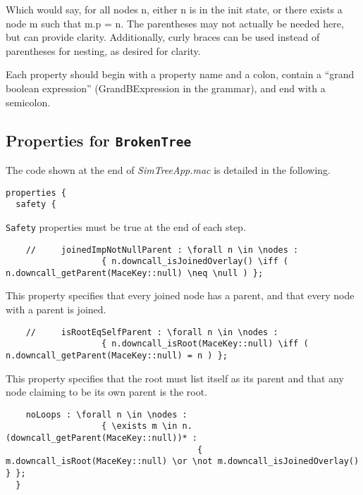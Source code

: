\documentclass[12pt,letterpaper]{article}
\newenvironment{code}
{\begin{list}{}{\setlength{\leftmargin}{1em}}\item\scriptsize\bfseries}
{\end{list}}
\begin{document}
Which would say, for all nodes n, either n is in the init state, or there exists a node m such that m.p = n.  The parentheses may not actually be needed here, but can provide clarity.  Additionally, curly braces can be used instead of parentheses for nesting, as desired for clarity.

Each property should begin with a property name and a colon, contain a ``grand boolean expression'' (GrandBExpression in the grammar), and end with a semicolon.

\subsection {Properties for \texttt{BrokenTree}}
\label{PropertiesForBrokenTree}
The code shown at the end of \emph{SimTreeApp.mac} is detailed in the following.
\begin{code}
\begin{verbatim}
properties {
  safety {
\end{verbatim}
\end{code}
\texttt{Safety} properties must be true at the end of each step.
\begin{code}
\begin{verbatim}
    //     joinedImpNotNullParent : \forall n \in \nodes : 
                   { n.downcall_isJoinedOverlay() \iff ( n.downcall_getParent(MaceKey::null) \neq \null ) };
\end{verbatim}
\end{code}
This property specifies that every joined node has a parent, and that every node with a parent is joined.
\begin{code}
\begin{verbatim}
    //     isRootEqSelfParent : \forall n \in \nodes : 
                   { n.downcall_isRoot(MaceKey::null) \iff ( n.downcall_getParent(MaceKey::null) = n ) };
\end{verbatim}
\end{code}
This property specifies that the root must list itself as its parent and that any node claiming to be its own parent is the root.
\begin{code}
\begin{verbatim}
    noLoops : \forall n \in \nodes : 
                   { \exists m \in n.(downcall_getParent(MaceKey::null))* : 
                                      { m.downcall_isRoot(MaceKey::null) \or \not m.downcall_isJoinedOverlay() } };
  }
\end{verbatim}
\end{code}
\end{document}
